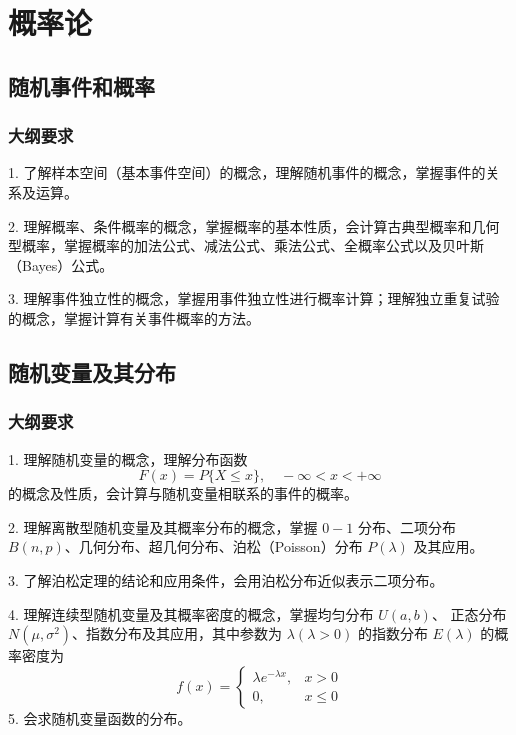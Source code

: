 \chapter{概率论}

\newcommand{\bbP}{\mathbb{P}}
\newcommand{\bbE}{\mathbb{E}}
\newcommand{\bbD}{\mathbb{D}}

\section{随机事件和概率}

\subsection{大纲要求}

1. 了解样本空间（基本事件空间）的概念，理解随机事件的概念，掌握事件的关系及运算。

2. 理解概率、条件概率的概念，掌握概率的基本性质，会计算古典型概率和几何型概率，掌握概率的加法公式、减法公式、乘法公式、全概率公式以及贝叶斯（Bayes）公式。

3. 理解事件独立性的概念，掌握用事件独立性进行概率计算；理解独立重复试验的概念，掌握计算有关事件概率的方法。


\section{随机变量及其分布}

\subsection{大纲要求}

1. 理解随机变量的概念，理解分布函数
\[ F(x) = P\{X \leqslant x\}, \quad -\infty < x < +\infty \]
的概念及性质，会计算与随机变量相联系的事件的概率。

2. 理解离散型随机变量及其概率分布的概念，掌握 $0-1$ 分布、二项分布 $B(n, p)$、几何分布、超几何分布、泊松（Poisson）分布 $P(\lambda)$ 及其应用。

3. 了解泊松定理的结论和应用条件，会用泊松分布近似表示二项分布。

4. 理解连续型随机变量及其概率密度的概念，掌握均匀分布 $U(a, b)$、 正态分布 $N(\mu, \sigma^2)$、指数分布及其应用，其中参数为 $\lambda(\lambda > 0)$ 的指数分布 $E(\lambda)$ 的概率密度为
\[ f(x) = \begin{cases} \lambda e^{-\lambda x}, & x > 0 \\ 0, &x \leqslant 0 \end{cases} \]
5. 会求随机变量函数的分布。

